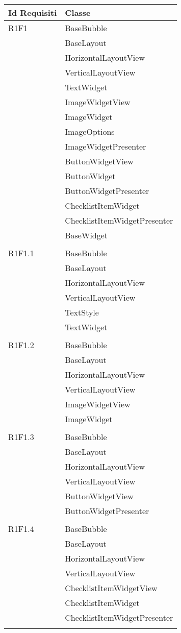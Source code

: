 \begin{center}
	\begin{longtable}{|p{7cm}|p{7cm}|}\hline
		Id Requisiti & Classe \\ \hline
		R1F1 & BaseBubble \\ & BaseLayout \\ & HorizontalLayoutView \\ & VerticalLayoutView \\ & TextWidget \\ & ImageWidgetView \\ & ImageWidget \\ & ImageOptions \\ & ImageWidgetPresenter \\ & ButtonWidgetView \\ & ButtonWidget \\ & ButtonWidgetPresenter \\ & ChecklistItemWidget \\ & ChecklistItemWidgetPresenter \\ & BaseWidget \\ & \\ \hline
		R1F1.1 & BaseBubble \\ & BaseLayout \\ & HorizontalLayoutView \\ & VerticalLayoutView \\ & TextStyle \\ & TextWidget \\ & \\ \hline
		R1F1.2 & BaseBubble \\ & BaseLayout \\ & HorizontalLayoutView \\ & VerticalLayoutView \\ & ImageWidgetView \\ & ImageWidget \\ & \\ \hline
		R1F1.3 & BaseBubble \\ & BaseLayout \\ & HorizontalLayoutView \\ & VerticalLayoutView \\ & ButtonWidgetView \\ & ButtonWidgetPresenter \\ & \\ \hline
		R1F1.4 & BaseBubble \\ & BaseLayout \\ & HorizontalLayoutView \\ & VerticalLayoutView \\ & ChecklistItemWidgetView \\ & ChecklistItemWidget \\ & ChecklistItemWidgetPresenter \\ & \\ \hline

\end{longtable}
\end{center}

